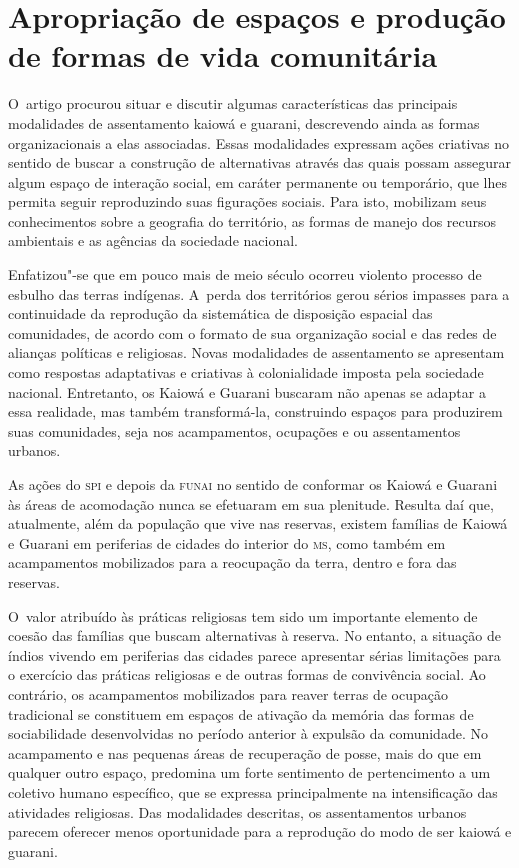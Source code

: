 \section{Apropriação de espaços e produção de formas de vida comunitária}

O~artigo procurou situar e discutir algumas características das
principais modalidades de assentamento kaiowá e guarani, descrevendo
ainda as formas organizacionais a elas associadas. Essas modalidades
expressam ações criativas no sentido de buscar a construção de
alternativas através das quais possam assegurar algum espaço de
interação social, em caráter permanente ou temporário, que lhes permita
seguir reproduzindo suas figurações sociais. Para isto, mobilizam seus
conhecimentos sobre a geografia do território, as formas de manejo dos
recursos ambientais e as agências da sociedade nacional. 

Enfatizou"-se que em pouco mais de meio século ocorreu violento processo
de esbulho das terras indígenas. A~perda dos territórios gerou sérios
impasses para a continuidade da reprodução da sistemática de disposição
espacial das comunidades, de acordo com o formato de sua organização
social e das redes de alianças políticas e religiosas. Novas
modalidades de assentamento se apresentam como respostas adaptativas e
criativas à colonialidade imposta pela sociedade nacional. Entretanto,
os Kaiowá e Guarani buscaram não apenas se adaptar a essa realidade,
mas também transformá-la, construindo espaços para produzirem suas
comunidades, seja nos acampamentos, ocupações e ou assentamentos
urbanos.

As ações do \textsc{spi} e depois da \textsc{funai} no sentido de conformar os Kaiowá e
Guarani às áreas de acomodação nunca se efetuaram em sua plenitude.
Resulta daí que, atualmente, além da população que vive nas reservas,
existem famílias de Kaiowá e Guarani em periferias de cidades do
interior do \textsc{ms}, como também em acampamentos mobilizados para a
reocupação da terra, dentro e fora das reservas.

O~valor atribuído às práticas religiosas tem sido um importante elemento
de coesão das famílias que buscam alternativas à reserva. No entanto, a
situação de índios vivendo em periferias das cidades parece apresentar
sérias limitações para o exercício das práticas religiosas e de outras
formas de convivência social. Ao contrário, os acampamentos mobilizados
para reaver terras de ocupação tradicional se constituem em espaços de
ativação da memória das formas de sociabilidade desenvolvidas no
período anterior à expulsão da comunidade. No acampamento e nas
pequenas áreas de recuperação de posse, mais do que em qualquer outro
espaço, predomina um forte sentimento de pertencimento a um coletivo
humano específico, que se expressa principalmente na intensificação das
atividades religiosas. Das modalidades descritas, os assentamentos
urbanos parecem oferecer menos oportunidade para a reprodução do modo
de ser kaiowá e guarani. 

